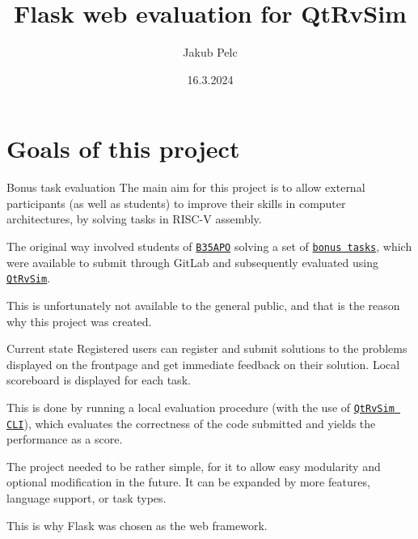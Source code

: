\documentclass{beamer}
\title{Flask web evaluation for QtRvSim}
\date{16.3.2024}
\author{Jakub Pelc}
\institute{Faculty of Electrical Engineering, Czech Technical University in Prague \par Installfest 2024}
\begin{document}
	\maketitle
	\section{Goals of this project}

	\begin{frame}{Bonus task evaluation}
		The main aim for this project is to allow external participants (as well as students) to improve their skills in computer architectures, by solving tasks in RISC-V assembly. \par

		The original way involved students of \href{https://cw.fel.cvut.cz/wiki/courses/b35apo/en/start}{\texttt{B35APO}} solving a set of \href{https://cw.fel.cvut.cz/wiki/courses/b35apo/en/homeworks/bonus/start}{\texttt{bonus tasks}},
		which were available to submit through GitLab and subsequently evaluated using \href{https://github.com/cvut/qtrvsim}{\texttt{QtRvSim}}. \par

		This is unfortunately not available to the general public, and that is the reason why this project was created.
	\end{frame}

	\begin{frame}{Current state}
		Registered users can register and submit solutions to the problems displayed on the frontpage and get immediate feedback on their solution.
		Local scoreboard is displayed for each task.\par

		This is done by running a local evaluation procedure (with the use of \href{https://github.com/cvut/qtrvsim}{\texttt{QtRvSim CLI}}), which evaluates the correctness of the code submitted and yields the performance as a score.

		The project needed to be rather simple, for it to allow easy modularity and optional modification in the future. It can be expanded by
		more features, language support, or task types. \par
		
		This is why Flask was chosen as the web framework.
	\end{frame}
	
\end{document}
